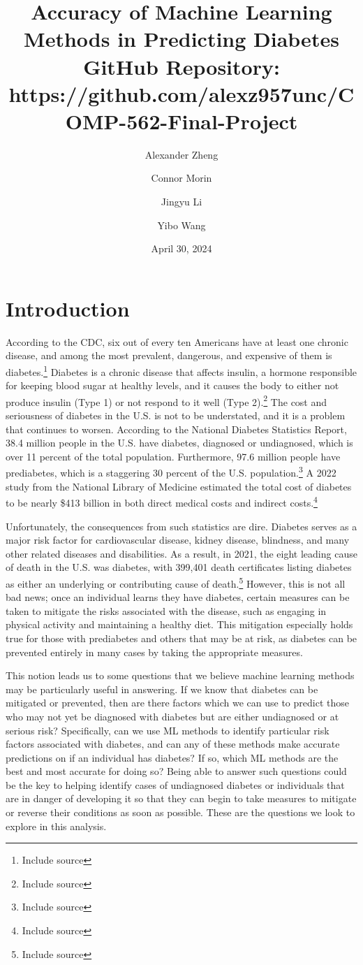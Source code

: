 \documentclass[12pt]{article}
\title{%
  Accuracy of Machine Learning Methods in Predicting Diabetes \\
  \vspace{5mm}
  \large GitHub Repository: https://github.com/alexz957unc/COMP-562-Final-Project}
\author{Alexander Zheng\and Connor Morin\and Jingyu Li\and Yibo Wang}
\date{April 30, 2024}
\begin{document}
\maketitle

\section{Introduction}
According to the CDC, six out of every ten Americans have at least one chronic disease, and among the most prevalent, dangerous, and expensive of them is diabetes.\footnote{Include source} Diabetes is a chronic disease that affects insulin, a hormone responsible for keeping blood sugar at healthy levels, and it causes the body to either not produce insulin (Type 1) or not respond to it well (Type 2).\footnote{Include source} The cost and seriousness of diabetes in the U.S. is not to be understated, and it is a problem that continues to worsen. According to the National Diabetes Statistics Report, 38.4 million people in the U.S. have diabetes, diagnosed or undiagnosed, which is over 11 percent of the total population. Furthermore, 97.6 million people have prediabetes, which is a staggering 30 percent of the U.S. population.\footnote{Include source} A 2022 study from the National Library of Medicine estimated the total cost of diabetes to be nearly \$413 billion in both direct medical costs and indirect costs.\footnote{Include source} 

Unfortunately, the consequences from such statistics are dire. Diabetes serves as a major risk factor for cardiovascular disease, kidney disease, blindness, and many other related diseases and disabilities. As a result, in 2021, the eight leading cause of death in the U.S. was diabetes, with 399,401 death certificates listing diabetes as either an underlying or contributing cause of death.\footnote{Include source} However, this is not all bad news; once an individual learns they have diabetes, certain measures can be taken to mitigate the risks associated with the disease, such as engaging in physical activity and maintaining a healthy diet. This mitigation especially holds true for those with prediabetes and others that may be at risk, as diabetes can be prevented entirely in many cases by taking the appropriate measures.

This notion leads us to some questions that we believe machine learning methods may be particularly useful in answering. If we know that diabetes can be mitigated or prevented, then are there factors which we can use to predict those who may not yet be diagnosed with diabetes but are either undiagnosed or at serious risk? Specifically, can we use ML methods to identify particular risk factors associated with diabetes, and can any of these methods make accurate predictions on if an individual has diabetes? If so, which ML methods are the best and most accurate for doing so? Being able to answer such questions could be the key to helping identify cases of undiagnosed diabetes or individuals that are in danger of developing it so that they can begin to take measures to mitigate or reverse their conditions as soon as possible. These are the questions we look to explore in this analysis.
\end{document}
